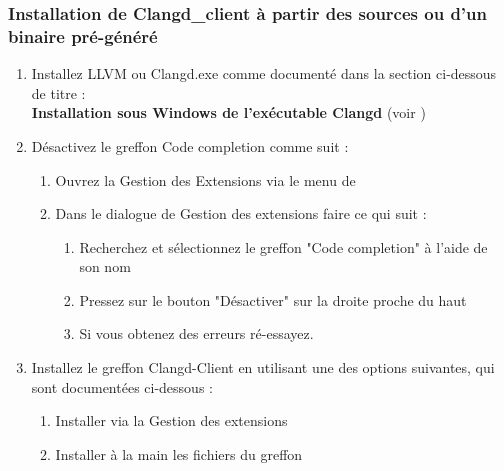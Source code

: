\subsubsection{Installation de Clangd\_client à partir des sources ou d'un binaire pré-généré}
\begin{enumerate}[noitemsep]
\item Installez LLVM ou Clangd.exe comme documenté dans la section ci-dessous de titre : \\
          \textbf{Installation sous Windows de l'exécutable Clangd} (voir )

\item Désactivez le greffon Code completion comme suit :
    \begin{enumerate}[noitemsep]
    \item Ouvrez la Gestion des Extensions via le menu de \codeblocks \newline
    \item Dans le dialogue de Gestion des extensions faire ce qui suit :
        \begin{enumerate}[noitemsep]
        \item Recherchez et sélectionnez le greffon "Code completion" à l'aide de son nom 
        \item Pressez sur le bouton "Désactiver" sur la droite proche du haut
        \item Si vous obtenez des erreurs ré-essayez.
        \end{enumerate}
    \end{enumerate}
	   
\item Installez le greffon Clangd-Client en utilisant une des options suivantes, qui sont documentées ci-dessous :
    \begin{enumerate}[noitemsep]
    \item Installer via la Gestion des extensions
    \item Installer à la main les fichiers du greffon
    \end{enumerate}
	

\end{enumerate}
